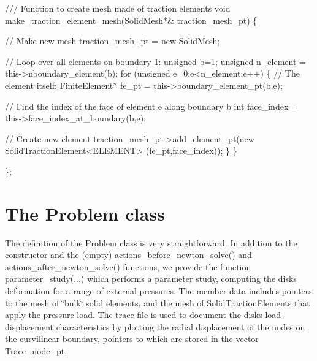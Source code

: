\begin{DoxyCodeInclude}

\textcolor{comment}{}
\textcolor{comment}{ /// Function to create mesh made of traction elements}
\textcolor{comment}{} \textcolor{keywordtype}{void} make\_traction\_element\_mesh(SolidMesh*& traction\_mesh\_pt)
  \{

   \textcolor{comment}{// Make new mesh}
   traction\_mesh\_pt = \textcolor{keyword}{new} SolidMesh;

   \textcolor{comment}{// Loop over all elements on boundary 1:}
   \textcolor{keywordtype}{unsigned} b=1;
   \textcolor{keywordtype}{unsigned} n\_element = this->nboundary\_element(b);
   \textcolor{keywordflow}{for} (\textcolor{keywordtype}{unsigned} e=0;e<n\_element;e++)
    \{
     \textcolor{comment}{// The element itself:}
     FiniteElement* fe\_pt = this->boundary\_element\_pt(b,e);
     
     \textcolor{comment}{// Find the index of the face of element e along boundary b}
     \textcolor{keywordtype}{int} face\_index = this->face\_index\_at\_boundary(b,e);
     
     \textcolor{comment}{// Create new element}
     traction\_mesh\_pt->add\_element\_pt(\textcolor{keyword}{new} SolidTractionElement<ELEMENT>
                                      (fe\_pt,face\_index));
    \}
  \}

\};

\end{DoxyCodeInclude}




 

\hypertarget{index_problem_class}{}\section{The Problem class}\label{index_problem_class}
The definition of the Problem class is very straightforward. In addition to the constructor and the (empty) {\ttfamily actions\+\_\+before\+\_\+newton\+\_\+solve()} and {\ttfamily actions\+\_\+after\+\_\+newton\+\_\+solve()} functions, we provide the function {\ttfamily parameter\+\_\+study}(...) which performs a parameter study, computing the disk\textquotesingle{}s deformation for a range of external pressures. The member data includes pointers to the mesh of \char`\"{}bulk\char`\"{} solid elements, and the mesh of {\ttfamily Solid\+Traction\+Elements} that apply the pressure load. The trace file is used to document the disk\textquotesingle{}s load-\/displacement characteristics by plotting the radial displacement of the nodes on the curvilinear boundary, pointers to which are stored in the vector {\ttfamily Trace\+\_\+node\+\_\+pt}.


